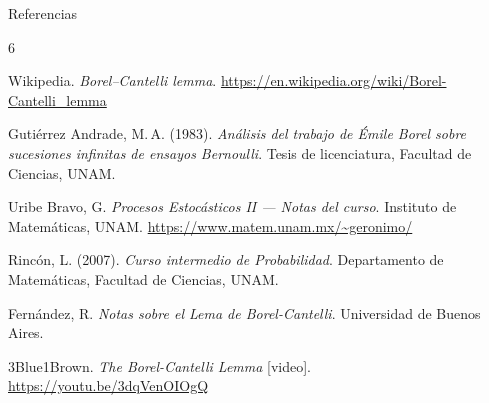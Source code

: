 \documentclass[11pt]{beamer}
\begin{document}
\begin{frame}{Referencias}

  \begin{thebibliography}{6}
    \footnotesize

    Wikipedia.
    \textit{Borel–Cantelli lemma}.
    \url{https://en.wikipedia.org/wiki/Borel-Cantelli_lemma}

    Gutiérrez Andrade, M.\,A. (1983).
    \textit{Análisis del trabajo de Émile Borel sobre sucesiones infinitas
    de ensayos Bernoulli}.
    Tesis de licenciatura, Facultad de Ciencias, UNAM.

    Uribe Bravo, G.
    \textit{Procesos Estocásticos II --- Notas del curso}.
    Instituto de Matemáticas, UNAM.
    \url{https://www.matem.unam.mx/~geronimo/}

    Rincón, L. (2007).
    \textit{Curso intermedio de Probabilidad}.
    Departamento de Matemáticas, Facultad de Ciencias, UNAM.

    Fernández, R.
    \textit{Notas sobre el Lema de Borel-Cantelli}.
    Universidad de Buenos Aires.

    3Blue1Brown.
    \textit{The Borel-Cantelli Lemma} [video].
    \url{https://youtu.be/3dqVenOIOgQ}

  \end{thebibliography}

\end{frame}
\end{document}
